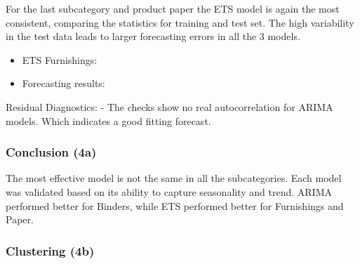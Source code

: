 \documentclass[
  letterpaper,
  DIV=11,
  numbers=noendperiod]{scrartcl}
\providecommand{\tightlist}{%
  \setlength{\itemsep}{0pt}\setlength{\parskip}{0pt}}\usepackage{longtable,booktabs,array}
\begin{document}
For the last subcategory and product paper the ETS model is again the
most consistent, comparing the statistics for training and test set. The
high variability in the test data leads to larger forecasting errors in
all the 3 models.

\begin{itemize}
\tightlist
\item
  ETS Furnishings:
\item
  Forecasting results:
\end{itemize}

Residual Diagnostics: - The checks show no real autocorrelation for
ARIMA models. Which indicates a good fitting forecast.

\subsubsection{Conclusion (4a)}\label{conclusion-4a}

The most effective model is not the same in all the subcategories. Each
model was validated based on its ability to capture seasonality and
trend. ARIMA performed better for Binders, while ETS performed better
for Furnishings and Paper.

\subsubsection{Clustering (4b)}\label{clustering-4b}
\end{document}
